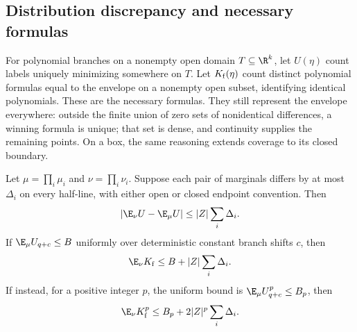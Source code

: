 \subsection{Distribution discrepancy and necessary formulas}
For polynomial branches on a nonempty open domain $T\subseteq\R^k$,
let $U(\eta)$ count labels uniquely minimizing somewhere on $T$.
Let $K_{\rm f}(\eta)$ count distinct polynomial formulas equal to the
envelope on a nonempty open subset, identifying identical polynomials.
These are the necessary formulas. They still represent the envelope everywhere:
outside the finite union of zero sets of nonidentical differences, a winning
formula is unique; that set is dense, and continuity supplies the remaining
points. On a box, the same reasoning extends coverage to its closed boundary.

\begin{theorem}\label{thm:transfer}
Let $\mu=\prod_i\mu_i$ and $\nu=\prod_i\nu_i$. Suppose each pair of
marginals differs by at most $\Delta_i$ on every half-line, with either
open or closed endpoint convention. Then
\begin{equation}\label{eq:Utransfer}
 |\E_\nu U-\E_\mu U|\le |Z|\sum_i\Delta_i.
\end{equation}
If $\E_\mu U_{q+c}\le B$ uniformly over deterministic constant branch
shifts $c$, then
\begin{equation}\label{eq:Ktransfer}
 \E_\nu K_{\rm f}\le B+|Z|\sum_i\Delta_i.
\end{equation}
If instead, for a positive integer $p$, the uniform bound is
$\E_\mu U_{q+c}^p\le B_p$, then
\begin{equation}\label{eq:transfermoments}
 \E_\nu K_{\rm f}^p\le B_p+2|Z|^p\sum_i\Delta_i.
\end{equation}
\end{theorem}

